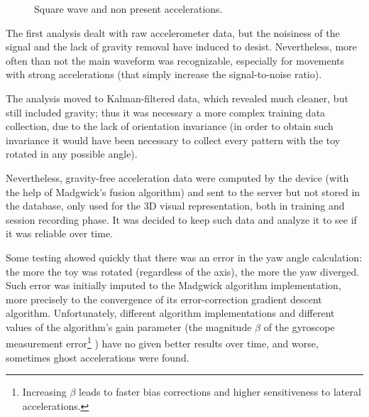 \begin{center}
	\begin{figure}[ht!]
		\caption{Square wave and non present accelerations.}
	\end{figure}
\end{center}

The first analysis dealt with raw accelerometer data, but the noisiness of the signal and the lack of gravity removal have induced to desist. Nevertheless, more often than not the main waveform was recognizable, especially for movements with strong accelerations (that simply increase the signal-to-noise ratio).
\bigbreak

The analysis moved to Kalman-filtered data, which revealed much cleaner, but still included gravity; thus it was necessary a more complex training data collection, due to the lack of orientation invariance (in order to obtain such invariance it would have been necessary to collect every pattern with the toy rotated in any possible angle).

Nevertheless, gravity-free acceleration data were computed by the device (with the help of Madgwick's fusion algorithm) and sent to the server but not stored in the database, only used for the 3D visual representation, both in training and session recording phase. It was decided to keep such data and analyze it to see if it was reliable over time.
\bigbreak

Some testing showed quickly that there was an error in the yaw angle calculation: the more the toy was rotated (regardless of the axis), the more the yaw diverged. Such error was initially imputed to the Madgwick algorithm implementation, more precisely to the convergence of its error-correction gradient descent algorithm. Unfortunately, different algorithm implementations and different values of the algorithm's gain parameter (the magnitude $\beta$ of the gyroscope measurement error\footnote{Increasing $\beta$ leads to faster bias corrections and higher sensitiveness to lateral accelerations.} \cite[13]{Mad10}) have no given better results over time, and worse, sometimes ghost accelerations were found.
\bigbreak

